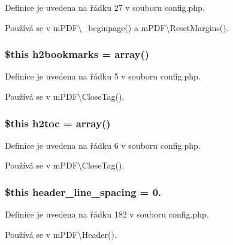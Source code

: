 Definice je uvedena na řádku 27 v souboru config.\-php.



Používá se v m\-P\-D\-F\textbackslash{}\-\_\-beginpage() a m\-P\-D\-F\textbackslash{}\-Reset\-Margins().

\hypertarget{config_8php_a0d318a973a665abc308c719941b316a4}{
\subsubsection[{h2bookmarks}]{\setlength{\rightskip}{0pt plus 5cm}\$this h2bookmarks = array()}}\label{config_8php_a0d318a973a665abc308c719941b316a4}


Definice je uvedena na řádku 5 v souboru config.\-php.



Používá se v m\-P\-D\-F\textbackslash{}\-Close\-Tag().

\hypertarget{config_8php_a7fdd837f73ced736bdaa63537f326fec}{
\subsubsection[{h2toc}]{\setlength{\rightskip}{0pt plus 5cm}\$this h2toc = array()}}\label{config_8php_a7fdd837f73ced736bdaa63537f326fec}


Definice je uvedena na řádku 6 v souboru config.\-php.



Používá se v m\-P\-D\-F\textbackslash{}\-Close\-Tag().

\hypertarget{config_8php_a95e89f0ed77e9327ba63d8af50837d89}{
\subsubsection[{header\-\_\-line\-\_\-spacing}]{\setlength{\rightskip}{0pt plus 5cm}\$this header\-\_\-line\-\_\-spacing = 0.}}\label{config_8php_a95e89f0ed77e9327ba63d8af50837d89}


Definice je uvedena na řádku 182 v souboru config.\-php.



Používá se v m\-P\-D\-F\textbackslash{}\-Header().

